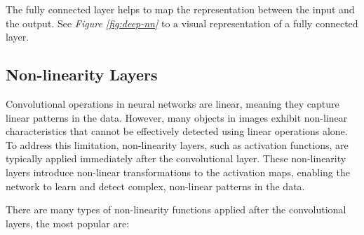 The fully connected layer helps to map the representation between the input and
the output. See \textit{Figure \ref{fig:deep-nn}} to a visual representation of
a fully connected layer. \newline

\subsection{Non-linearity Layers}

Convolutional operations in neural networks are linear, meaning they capture
linear patterns in the data. However, many objects in images exhibit non-linear
characteristics that cannot be effectively detected using linear operations
alone. To address this limitation, non-linearity layers, such as activation
functions, are typically applied immediately after the convolutional layer.
These non-linearity layers introduce non-linear transformations to the
activation maps, enabling the network to learn and detect complex, non-linear
patterns in the data. \newline

There are many types of non-linearity functions applied after the convolutional
layers, the most popular are: \newline

